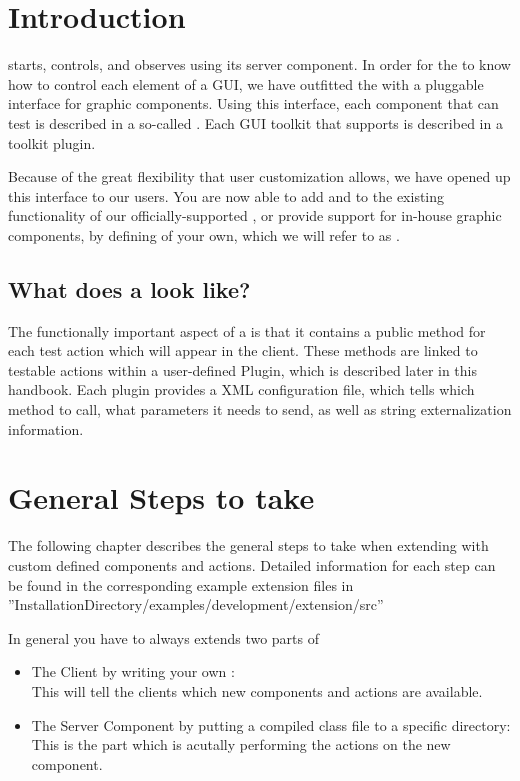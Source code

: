 \chapter{Introduction}
\label{introduction}

\app{} starts, controls, and observes \gdauts using its server
component. In order for the \gdagent to know how to control each
element of a GUI, we have outfitted the \gdagent with a pluggable interface
for graphic components. Using this interface, each component that \app{}
can test is described in a
so-called \textbf{\gdimplclass{}}. Each GUI toolkit that \app{} supports
is described in a toolkit plugin.

Because of the great flexibility that user customization allows, we
have opened up this interface to our users. You are now able to add
and to the existing functionality of our officially-supported
\gdimplclasses{},
or provide support for in-house graphic components, by
defining \gdimplclasses of your own, which we will refer to as
\textbf{\gdtesterclasses}.

\section{What does a \gdtesterclass look like?}

The functionally important aspect of a \gdtesterclass is that it
contains a public method for each \app{} test action which will appear in
the client. These methods are linked to testable actions within a user-defined
\app{} Plugin, which is described later in this handbook. Each plugin
provides a XML configuration file,
which tells \app{} which method to call, what parameters it needs to
send, as well as string externalization information.

\chapter{General Steps to take}
\label{generalSteps}

The following chapter describes the general steps to take when extending \app{} with
custom defined components and actions. Detailed information for each step can be found in the
corresponding example extension files in 
''InstallationDirectory/examples/development/extension/src''

In general you have to always extends two parts of \app{}
\begin{itemize}
\item The \app{} Client by writing your own :\\
      This will tell the clients which new components and actions are available.
\item The \app{} Server Component by putting a compiled class file to a specific directory:\\
      This is the part which is acutally performing the actions on the new component.
\end{itemize}


